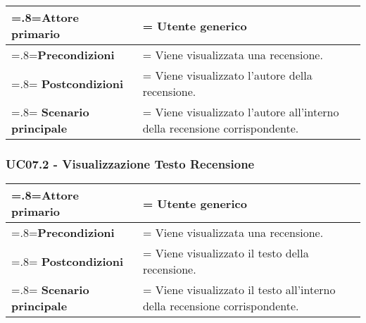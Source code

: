             \begin{center}
                \renewcommand{\arraystretch}{1.5}
                \renewcommand\tabularxcolumn[1]{m{#1}}
                \begin{tabularx}{0.9\textwidth} {
                    >{\hsize=.8\hsize\linewidth=\hsize}X
                    >{\hsize=1.2\hsize\linewidth=\hsize}X}
                    \hline
                    \textbf{Attore primario} & Utente generico \\
                    \hline
                    \textbf{Precondizioni} & Viene visualizzata una recensione. \\
                    \hline
                    \textbf{Postcondizioni} & Viene visualizzato l'autore della recensione. \\
                    \hline
                    \textbf{Scenario principale} & Viene visualizzato l'autore all'interno della recensione corrispondente. \\
                    \hline
                \end{tabularx}
            \end{center}

        \subsubsection{UC07.2 - Visualizzazione Testo Recensione}
        \label{UC07.2}

            \begin{center}
                \renewcommand{\arraystretch}{1.5}
                \renewcommand\tabularxcolumn[1]{m{#1}}
                \begin{tabularx}{0.9\textwidth} {
                    >{\hsize=.8\hsize\linewidth=\hsize}X
                    >{\hsize=1.2\hsize\linewidth=\hsize}X}
                    \hline
                    \textbf{Attore primario} & Utente generico \\
                    \hline
                    \textbf{Precondizioni} & Viene visualizzata una recensione. \\
                    \hline
                    \textbf{Postcondizioni} & Viene visualizzato il testo della recensione. \\
                    \hline
                    \textbf{Scenario principale} & Viene visualizzato il testo all'interno della recensione corrispondente. \\
                    \hline
                \end{tabularx}
            \end{center}

